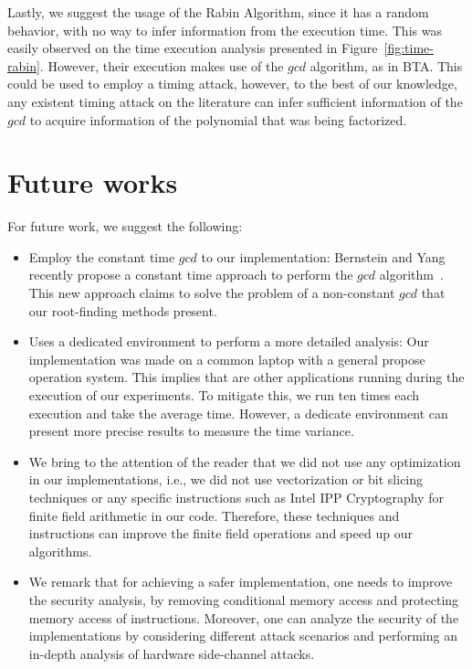 Lastly, we suggest the usage of the Rabin Algorithm, since it has a random behavior, with no way to infer information from the execution time. This was easily observed on the time execution analysis presented in Figure~\ref{fig:time-rabin}. However, their execution makes use of the $gcd$ algorithm, as in BTA. This could be used to employ a timing attack, however, to the best of our knowledge, any existent timing attack on the literature can infer sufficient information of the $gcd$ to acquire information of the polynomial that was being factorized.

\section{Future works}
For future work, we suggest the following:

\begin{itemize}
    \item Employ the constant time $gcd$ to our implementation: Bernstein and Yang recently propose a constant time approach to perform the $gcd$ algorithm~\cite{Bernstein_Yang_2019}. This new approach claims to solve the problem of a non-constant $gcd$ that our root-finding methods present. 
    \item Uses a dedicated environment to perform a more detailed analysis: Our implementation was made on a common laptop with a general propose operation system. This implies that are other applications running during the execution of our experiments. To mitigate this, we run ten times each execution and take the average time. However, a dedicate environment can present more precise results to measure the time variance. 
    \item We bring to the attention of the reader that we did not use any optimization in our implementations, i.e., we did not use vectorization or bit slicing techniques or any specific instructions such as Intel\textsuperscript{\tiny\textregistered} IPP Cryptography for finite field arithmetic in our code. Therefore, these techniques and instructions can improve the finite field operations and speed up our algorithms.
    \item We remark that for achieving a safer implementation, one needs to improve the security analysis, by removing conditional memory access and protecting memory access of instructions. Moreover, one can analyze the security of the implementations by considering different attack scenarios and performing an in-depth analysis of hardware side-channel attacks. 
\end{itemize}